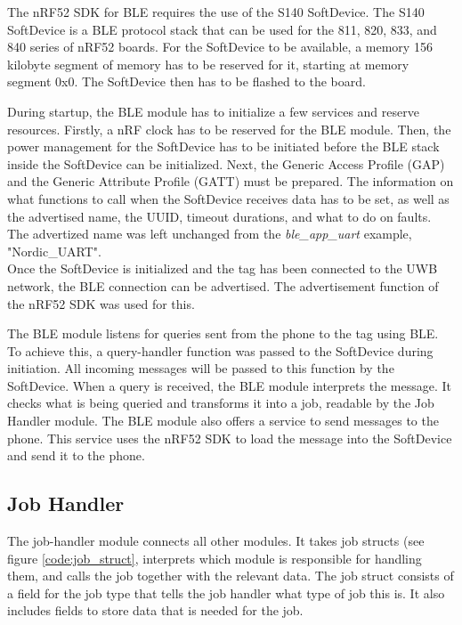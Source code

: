 The nRF52 SDK for BLE requires the use of the S140 SoftDevice.
The S140 SoftDevice is a BLE protocol stack that can be used for the 811, 820, 833, and 840 series of nRF52 boards.
For the SoftDevice to be available, a memory 156 kilobyte segment of memory has to be reserved for it, starting at memory segment 0x0.
The SoftDevice then has to be flashed to the board.

During startup, the BLE module has to initialize a few services and reserve resources.
Firstly, a nRF clock has to be reserved for the BLE module.
Then, the power management for the SoftDevice has to be initiated before the BLE stack inside the SoftDevice can be initialized.
Next, the Generic Access Profile (GAP) and the Generic Attribute Profile (GATT) must be prepared.
The information on what functions to call when the SoftDevice receives data has to be set, as well as the advertised name, the UUID, timeout durations, and what to do on faults.
The advertized name was left unchanged from the \textit{ble{\_}app{\_}uart} example, "Nordic{\_}UART".\\
Once the SoftDevice is initialized and the tag has been connected to the UWB network, the BLE connection can be advertised.
The advertisement function of the nRF52 SDK was used for this.


The BLE module listens for queries sent from the phone to the tag using BLE.
To achieve this, a query-handler function was passed to the SoftDevice during initiation.
All incoming messages will be passed to this function by the SoftDevice.
When a query is received, the BLE module interprets the message.
It checks what is being queried and transforms it into a job, readable by the Job Handler module.
The BLE module also offers a service to send messages to the phone.
This service uses the nRF52 SDK to load the message into the SoftDevice and send it to the phone.


\subsection{Job Handler}
\label{ss:job_handler_module}

The job-handler module connects all other modules.
It takes job structs (see figure \ref{code:job_struct}, interprets which module is responsible for handling them, and calls the job together with the relevant data.
The job struct consists of a field for the job type that tells the job handler what type of job this is. It also includes fields to store data that is needed for the job.

